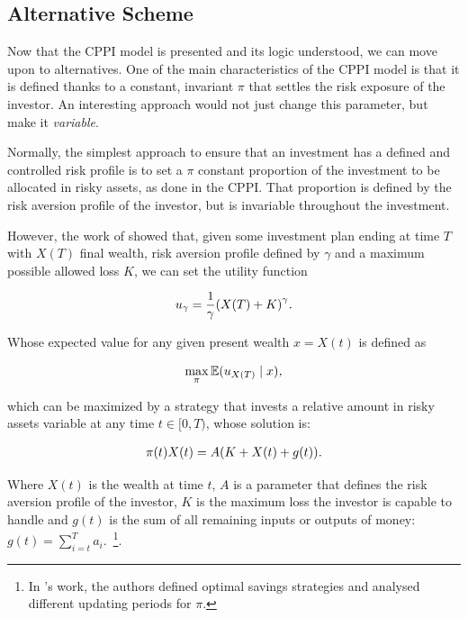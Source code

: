 \subsection{Alternative Scheme}

Now that the CPPI model is presented and its logic understood, we can move upon to alternatives. One of the main characteristics of the CPPI model is that it is defined thanks to a constant, invariant $\pi$ that settles the risk exposure of the investor. An interesting approach would not just change this parameter, but make it \emph{variable}.

Normally, the simplest approach to ensure that an investment has a defined and controlled risk profile is to set a $\pi$ constant proportion of the investment to be allocated in risky assets, as done in the CPPI. That proportion is defined by the risk aversion profile of the investor, but is invariable throughout the investment.

However, the work of \cite{a:guillen-optimisation} showed that, given some investment plan ending at time $T$ with $X(T)$ final wealth, risk aversion profile defined by $\gamma$ and a maximum possible allowed loss $K$, we can set the utility function

\begin{align}
    u_\gamma = \frac{1}{\gamma}\qty(X(T) + K)^\gamma \emph{.}
\end{align}

Whose expected value for any given present wealth $x = X(t)$ is defined as

\begin{align}\label{eq:maxE}
    \max_{\pi}\EX\giventhat{u_{X(T)}}{x} \emph{,}
\end{align}

which can be maximized by a strategy that invests a relative amount in risky assets variable at any time $t \in [0,T)$, whose solution is:

\begin{align}
    \pi(t)X(t) = A\qty(K + X(t) + g(t)) \textit{.}
\end{align}

Where $X(t)$ is the wealth at time $t$, $A$ is a parameter that defines the risk aversion profile of the investor, $K$ is the maximum loss the investor is capable to handle and $g(t)$ is the sum of all remaining inputs or outputs of money: $g(t) = \sum_{i=t}^{T}a_i$.~\footnote{In \cite{a:donnelly-savings-decisions}'s work, the authors defined optimal savings strategies and analysed different updating periods for $\pi$.}.

